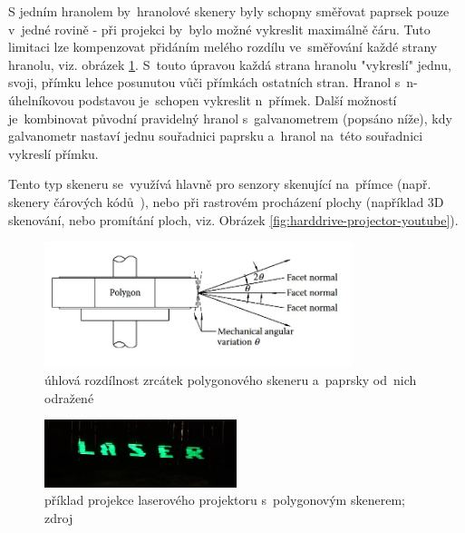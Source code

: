 
%

S jedním hranolem by~hranolové skenery byly schopny směřovat paprsek pouze v~jedné rovině - při projekci by~bylo možné vykreslit maximálně čáru. Tuto limitaci lze kompenzovat přidáním melého rozdílu ve~směřování každé strany hranolu, viz. obrázek \ref{fig:polygon-angular-variation}. S~touto úpravou každá strana hranolu "vykreslí" jednu, svoji, přímku lehce posunutou vůči přímkách ostatních stran. Hranol s~n-úhelníkovou podstavou je~schopen vykreslit n~přímek.
Další možností je~kombinovat původní pravidelný hranol s~galvanometrem (popsáno níže), kdy galvanometr nastaví jednu souřadnici paprsku a~hranol na~této souřadnici vykreslí přímku.

Tento typ skeneru se~využívá hlavně pro senzory skenující na~přímce (např. skenery čárových kódů~\cite{history-of-barcode-scanning}), nebo při rastrovém procházení plochy (například 3D skenování, nebo promítání ploch, viz. Obrázek \ref{fig:harddrive-projector-youtube}).

\begin{figure}[!htb]
  \centering
  \includegraphics[width=0.8\textwidth]{img/polygon-angular-variation.jpg}
  \caption{\label{fig:polygon-angular-variation} úhlová rozdílnost zrcátek polygonového skeneru a~paprsky od~nich odražené}
\end{figure}


\begin{figure}[!htb]
  \centering
  \includegraphics[width=0.5\textwidth]{img/harddrive-projection.jpg}
  \caption{\label{fig:harddrive-projection} příklad projekce laserového projektoru s~polygonovým skenerem; zdroj~\cite{harddrive-projector-youtube}}
\end{figure}

